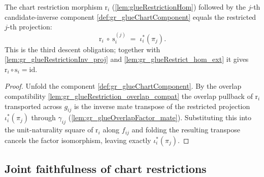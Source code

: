 \begin{lemma}
  \label{lem:gr_glueRestrictionHom_glueChartComponent}
  The chart restriction morphism \(\mathrm{r}_i\) (\cref{lem:glueRestrictionHom})
  followed by the \(j\)-th candidate-inverse component \cref{def:gr_glueChartComponent}
  equals the restricted \(j\)-th projection:
  \[
    \mathrm{r}_i\ \circ\ \mathrm{s}_i^{(j)}
      \;=\; \iota_i^{*}(\pi_j).
  \]
  This is the third descent obligation; together with
  \cref{lem:gr_glueRestrictionInv_proj} and \cref{lem:gr_glueRestrict_hom_ext} it gives
  \(\mathrm{r}_i \circ \mathrm{s}_i = \mathrm{id}\).
\end{lemma}
\begin{proof}
    \leanok
  Unfold the component \cref{def:gr_glueChartComponent}. By the overlap compatibility
  \cref{lem:gr_glueRestriction_overlap_compat} the overlap pullback of \(\mathrm{r}_i\)
  transported across \(g_{ij}\) is the inverse mate transpose of the restricted
  projection \(\iota_i^{*}(\pi_j)\) through \(\gamma_{ij}\)
  (\cref{lem:gr_glueOverlapFactor_mate}). Substituting this into the unit-naturality
  square of \(\mathrm{r}_i\) along \(f_{ij}\) and folding the resulting transpose
  cancels the factor isomorphism, leaving exactly \(\iota_i^{*}(\pi_j)\).
\end{proof}

\subsection{Joint faithfulness of chart restrictions}


